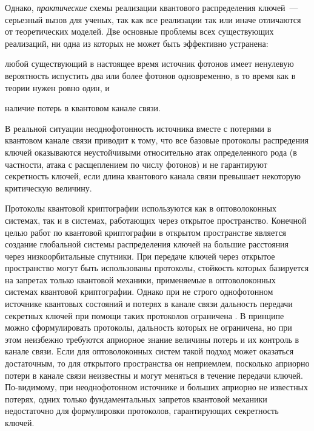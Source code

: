 Однако, \textit{практические} схемы реализации квантового распределения ключей~--- серьезный вызов для ученых, так как все реализации так или иначе отличаются от теоретических моделей. 
Две основные проблемы всех существующих реализаций, ни одна из которых не может быть эффективно устранена: 
\begin{inparaenum}[\itshape 1\upshape)]
\item любой существующий в настоящее время источник фотонов имеет ненулевую вероятность испустить два или более фотонов одновременно, в то время как в теории нужен ровно один\cite{lounis2000Sinphodemsinmolrootem, benjamin2000Sinphodem}, и
\item наличие потерь в квантовом канале связи.
\end{inparaenum}

В реальной ситуации неоднофотонность источника вместе с потерями в квантовом канале связи приводит к тому, что все базовые протоколы распредения ключей оказываются неустойчивыми относительно атак определенного рода (в частности, атака с расщеплением по числу фотонов) и не гарантируют секретность ключей, если длина квантового канала связи превышает некоторую критическую величину. 

Протоколы квантовой криптографии используются как в оптоволоконных системах, так и в системах, работающих через открытое пространство.
Конечной целью работ по квантовой криптографии в открытом пространстве является создание глобальной системы распределения ключей на большие расстояния через низкоорбитальные спутники. 
При передаче ключей через открытое пространство могут быть использованы протоколы, стойкость которых базируется на запретах только квантовой механики, применяемые в оптоволоконных системах квантовой криптографии. 
Однако при не строго однофотонном источнике квантовых состояний и потерях в канале связи дальность передачи секретных ключей при помощи таких протоколов ограничена \cite{scarani2009secpraquakeydis}. 
В принципе можно сформулировать протоколы, дальность которых не ограничена, но при этом неизбежно требуются априорное знание величины потерь и их контроль в канале связи. 
Если для оптоволоконных систем такой подход может оказаться достаточным, то для открытого пространства он неприемлем, посколько априорно потери в канале связи неизвестны и могут меняться в течение передачи ключей. По-видимому, при неоднофотонном источнике и больших априорно не известных потерях, одних только фундаментальных запретов квантовой механики недостаточно для формулировки протоколов, гарантирующих секретность ключей.

